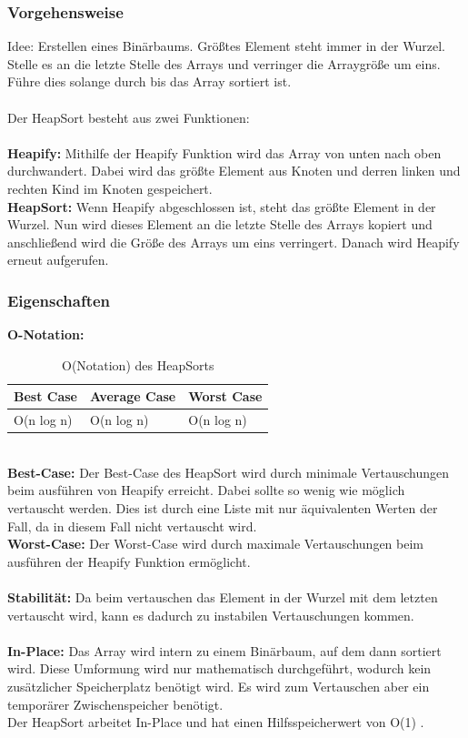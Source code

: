\documentclass{article}
\begin{document}
\subsubsection{Vorgehensweise}
Idee: Erstellen eines Binärbaums. Größtes Element steht immer in der Wurzel. Stelle es an die letzte Stelle des Arrays und verringer die Arraygröße um eins. Führe dies solange durch bis das Array sortiert ist.\\
\\
Der HeapSort besteht aus zwei Funktionen:\\\\
\textbf{Heapify:} Mithilfe der Heapify Funktion wird das Array von unten nach oben durchwandert. Dabei wird das größte Element aus Knoten und derren linken und rechten Kind im Knoten gespeichert. \\
\textbf{HeapSort:} Wenn Heapify abgeschlossen ist, steht das größte Element in der Wurzel. Nun wird dieses Element an die letzte Stelle des Arrays kopiert und anschließend wird die Größe des Arrays um eins verringert. Danach wird Heapify erneut aufgerufen.\\
\subsubsection{Eigenschaften}
\textbf{O-Notation:}
\begin{table}[h]
\centering
\begin{tabular}{lll}
	\hline
	\textbf{Best Case} & \textbf{Average Case} & \textbf{Worst Case} \\
	\hline
	O(n log n) & O(n log n) & O(n log n) \\
	\hline
\end{tabular}
\caption{O(Notation) des HeapSorts \cite{India2015Dataset}}
\label{tab:HeapSort}
\end{table}
\\
\textbf{Best-Case:} Der Best-Case des HeapSort wird durch minimale Vertauschungen beim ausführen von Heapify erreicht. Dabei sollte so wenig wie möglich vertauscht werden. Dies ist durch eine Liste mit nur äquivalenten Werten der Fall, da in diesem Fall nicht vertauscht wird. \\
\textbf{Worst-Case:} Der Worst-Case wird durch maximale Vertauschungen beim ausführen der Heapify Funktion ermöglicht. \\\\
\textbf{Stabilität:} Da beim vertauschen das Element in der Wurzel mit dem letzten vertauscht wird, kann es dadurch zu instabilen Vertauschungen kommen.  \\
\\
\textbf{In-Place:} Das Array wird intern zu einem Binärbaum, auf dem dann sortiert wird. Diese Umformung wird nur mathematisch durchgeführt, wodurch kein zusätzlicher Speicherplatz benötigt wird. Es wird zum Vertauschen aber ein temporärer Zwischenspeicher benötigt. \\Der HeapSort arbeitet In-Place und hat einen Hilfsspeicherwert von O(1) \cite{India2015Dataset}.\\
\end{document}
